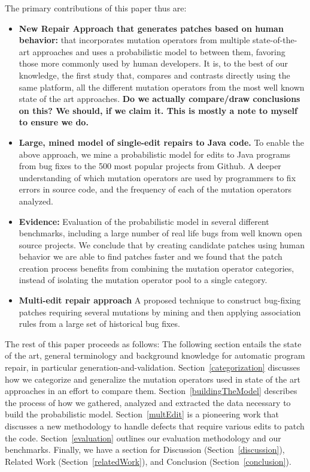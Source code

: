 \documentclass[conference]{IEEEtran}
\newcommand{\todo}[1]
  {{\scriptsize \textbf{\color{red} {#1}}}}
\begin{document}
The primary contributions of this paper thus are:
\begin{itemize}
  \item \textbf{New Repair Approach that generates patches based on human behavior:} that incorporates mutation operators
    from multiple state-of-the-art approaches and 
    uses a probabilistic model to between them, favoring those more commonly
    used by human developers. It is, to the best of our
    knowledge, the first study that, compares and contrasts directly using the
    same platform, all the different mutation operators from the most well known
    state of the art approaches.  \todo{Do we actually compare/draw conclusions
      on this?  We should, if we claim it.  This is mostly a note to myself to
      ensure we do.} 
    \item \textbf{Large, mined model of single-edit repairs to Java code.} To
      enable the above approach, we mine a probabilistic model for edits to Java programs
    from bug fixes to the 500 most popular projects from
    Github.   A deeper
    understanding of which mutation operators are used by programmers to fix
    errors in source code, and the frequency of each of the mutation operators
    analyzed. 
  \item \textbf{Evidence:} Evaluation of the probabilistic model in several
    different benchmarks, including a large number of real life bugs from well
    known open source projects. We conclude that by creating candidate patches using human behavior we are able to find patches faster and we found that the patch creation process benefits from combining the mutation operator categories, instead of isolating the mutation operator pool to a single category. 
  \item \textbf{Multi-edit repair approach} A proposed technique to construct 
    bug-fixing patches requiring several mutations by mining and then applying association
    rules from a large set of historical bug fixes. 
\end{itemize}

The rest of this paper proceeds as follows:
The following section entails the state of the art, general terminology and
background knowledge for automatic program repair, in particular
generation-and-validation. Section~\ref{categorization} discusses how we
categorize and generalize the mutation operators used in state of the art
approaches in an effort to compare them. Section~\ref{buildingTheModel}
describes the process of how we gathered, analyzed and extracted the data
necessary to build the probabilistic model. Section~\ref{multEdit} is a
pioneering work that discusses a new methodology to handle defects that require
various edits to patch the code. Section~\ref{evaluation} outlines our
evaluation methodology and our benchmarks.  Finally, we have a section for
Discussion (Section~\ref{discussion}), Related Work (Section~\ref{relatedWork}), and Conclusion (Section~\ref{conclusion}).
\end{document}

